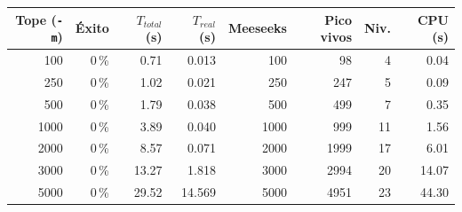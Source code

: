 \begin{tabular}{rrrrrrrr}
\toprule
Tope (\texttt{-m}) & Éxito & $T_{total}$ (s) & $T_{real}$ (s) & Meeseeks & Pico vivos & Niv. & CPU (s) \\
\midrule
100 & 0\,\% & 0.71 & 0.013 & 100 & 98 & 4 & 0.04 \\
250 & 0\,\% & 1.02 & 0.021 & 250 & 247 & 5 & 0.09 \\
500 & 0\,\% & 1.79 & 0.038 & 500 & 499 & 7 & 0.35 \\
1000 & 0\,\% & 3.89 & 0.040 & 1000 & 999 & 11 & 1.56 \\
2000 & 0\,\% & 8.57 & 0.071 & 2000 & 1999 & 17 & 6.01 \\
3000 & 0\,\% & 13.27 & 1.818 & 3000 & 2994 & 20 & 14.07 \\
5000 & 0\,\% & 29.52 & 14.569 & 5000 & 4951 & 23 & 44.30 \\
\bottomrule
\end{tabular}
